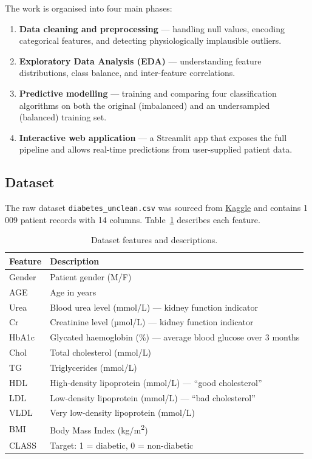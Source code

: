 \documentclass[12pt, a4paper]{article}
\begin{document}
The work is organised into four main phases:
\begin{enumerate}
    \item \textbf{Data cleaning and preprocessing} --- handling null values,
          encoding categorical features, and detecting physiologically
          implausible outliers.
    \item \textbf{Exploratory Data Analysis (EDA)} --- understanding feature
          distributions, class balance, and inter-feature correlations.
    \item \textbf{Predictive modelling} --- training and comparing four
          classification algorithms on both the original (imbalanced) and an
          undersampled (balanced) training set.
    \item \textbf{Interactive web application} --- a Streamlit app that exposes
          the full pipeline and allows real-time predictions from user-supplied
          patient data.
\end{enumerate}

\subsection{Dataset}

The raw dataset \texttt{diabetes\_unclean.csv} was sourced from
\href{https://www.kaggle.com/datasets/kabirolawalemohammed/diabetes-unclean}{Kaggle}
and contains 1\,009 patient records with 14 columns.
Table~\ref{tab:features} describes each feature.

\begin{table}[H]
\centering
\caption{Dataset features and descriptions.}
\label{tab:features}
\renewcommand{\arraystretch}{1.3}
\begin{tabularx}{\textwidth}{lX}
\toprule
\textbf{Feature} & \textbf{Description} \\
\midrule
Gender  & Patient gender (M/F) \\
AGE     & Age in years \\
Urea    & Blood urea level (mmol/L) --- kidney function indicator \\
Cr      & Creatinine level (µmol/L) --- kidney function indicator \\
HbA1c   & Glycated haemoglobin (\%) --- average blood glucose over 3 months \\
Chol    & Total cholesterol (mmol/L) \\
TG      & Triglycerides (mmol/L) \\
HDL     & High-density lipoprotein (mmol/L) --- ``good cholesterol'' \\
LDL     & Low-density lipoprotein (mmol/L) --- ``bad cholesterol'' \\
VLDL    & Very low-density lipoprotein (mmol/L) \\
BMI     & Body Mass Index (kg/m\textsuperscript{2}) \\
CLASS   & Target: 1 = diabetic, 0 = non-diabetic \\
\bottomrule
\end{tabularx}
\end{table}
\end{document}
